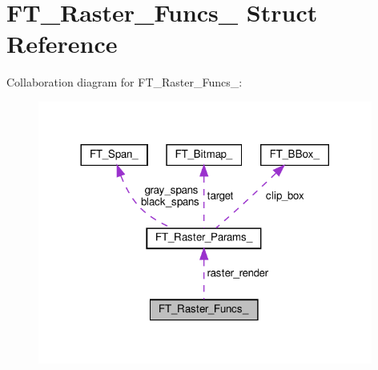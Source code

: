 \hypertarget{structFT__Raster__Funcs__}{}\section{F\+T\+\_\+\+Raster\+\_\+\+Funcs\+\_\+ Struct Reference}
\label{structFT__Raster__Funcs__}


Collaboration diagram for F\+T\+\_\+\+Raster\+\_\+\+Funcs\+\_\+\+:
\nopagebreak
\begin{figure}[H]
\begin{center}
\leavevmode
\includegraphics[width=312pt]{structFT__Raster__Funcs____coll__graph}
\end{center}
\end{figure}

